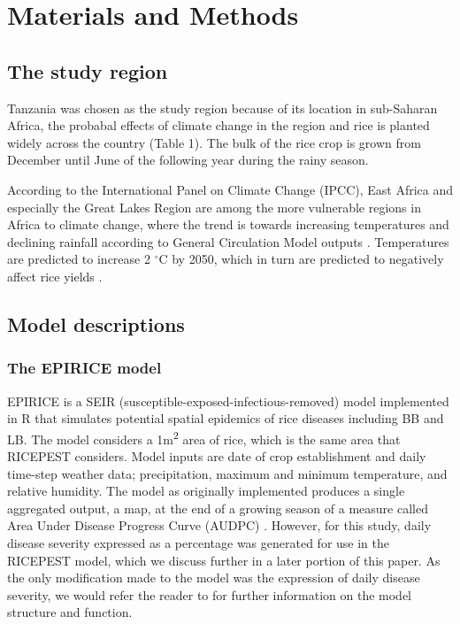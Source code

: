 \documentclass[preprint,12pt]{elsarticle}
\begin{document}
\section{Materials and Methods}


\subsection{The study region}
Tanzania was chosen as the study region because of its location in sub-Saharan Africa, the probabal effects of climate change in the region and rice is planted widely across the country \cite{Rowhani2011} (Table 1). The bulk of the rice crop is grown from December until June of the following year during the rainy season. 

According to the International Panel on Climate Change (IPCC), East Africa and especially the Great Lakes Region are among the more vulnerable regions in Africa to climate change, where the trend is towards increasing temperatures and declining rainfall according to General Circulation Model outputs \cite{Boko2007}. Temperatures are predicted to increase 2 $^{\circ}$C by 2050, which in turn are predicted to negatively affect rice yields \cite{Rowhani2011}.

\subsection{Model descriptions}
\subsubsection{The EPIRICE model}
EPIRICE \cite{Savary2012} is a SEIR (susceptible-exposed-infectious-removed) model \cite{Kermack1927, Madden2006} implemented in R \cite{R2014} that simulates potential spatial epidemics of rice diseases including BB and LB. The model considers a 1m\textsuperscript{2} area of rice, which is the same area that RICEPEST considers. Model inputs are date of crop establishment and daily time-step weather data; precipitation, maximum and minimum temperature, and relative humidity. The model as originally implemented produces a single aggregated output, a map, at the end of a growing season of a measure called Area Under Disease Progress Curve (AUDPC) \cite{Shaner1977}. However, for this study, daily disease severity expressed as a percentage was generated for use in the RICEPEST model, which we discuss further in a later portion of this paper. As the only modification made to the model was the expression of daily disease severity, we  would refer the reader to \citet{Savary2012} for further information on the model structure and function.
\end{document}
